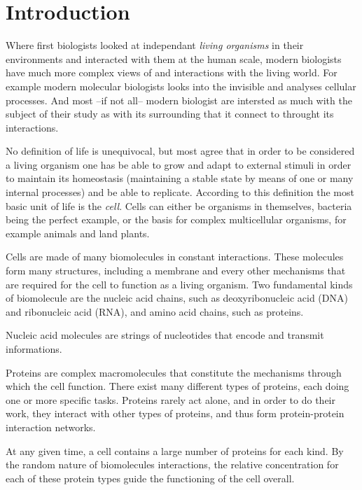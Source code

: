 \chapter{Introduction}
\label{chap:intro}

Where first biologists looked at independant \emph{living organisms} in their environments and interacted with them at the human scale, modern biologists have much more complex views of and interactions with the living world.
For example modern molecular biologists looks into the invisible and analyses cellular processes.
And most --if not all-- modern biologist are intersted as much with the subject of their study as with its surrounding that it connect to throught its interactions.

No definition of life is unequivocal, but most agree that in order to be considered a living organism one has be able to grow and adapt to external stimuli in order to maintain its homeostasis (maintaining a stable state by means of one or many internal processes) and be able to replicate.
According to this definition the most basic unit of life is the \emph{cell}.
Cells can either be organisms in themselves, bacteria being the perfect example, or the basis for complex multicellular organisms, for example animals and land plants.

Cells are made of many biomolecules in constant interactions.
These molecules form many structures, including a membrane and every other mechanisms that are required for the cell to function as a living organism.
Two fundamental kinds of biomolecule are the nucleic acid chains, such as deoxyribonucleic acid (DNA) and ribonucleic acid (RNA), and amino acid chains, such as proteins.

Nucleic acid molecules are strings of nucleotides that encode and transmit informations.

Proteins are complex macromolecules that constitute the mechanisms through which the cell function.
There exist many different types of proteins, each doing one or more specific tasks.
Proteins rarely act alone, and in order to do their work, they interact with other types of proteins, and thus form protein-protein interaction networks.

At any given time, a cell contains a large number of proteins for each kind.
By the random nature of biomolecules interactions, the relative concentration for each of these protein types guide the functioning of the cell overall.

